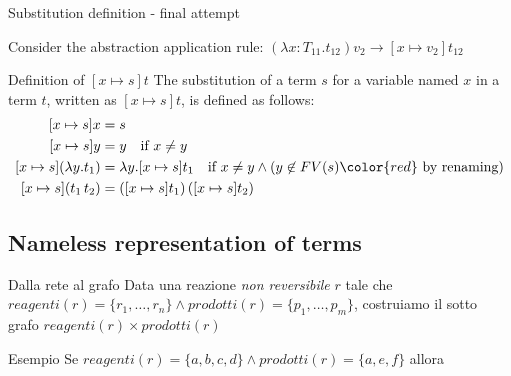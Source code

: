 \documentclass[8pt]{beamer}
\begin{document}
\begin{frame}{Substitution definition - final attempt}

    Consider the abstraction application rule:
        $(\lambda x:T_{11}.t_{12})v_{2} \rightarrow [x \mapsto v_{2}]t_{12}$

    \begin{block}{Definition of $[x \mapsto s]t$}
        The substitution of a term $s$ for a variable named $x$ in a term $t$,
        written as $[x \mapsto s]t$, is defined as follows:
        \begin{displaymath}
            \begin{split}
                [x \mapsto s]x &= s \\
                [x \mapsto s]y &= y \quad \text{if } x \not = y\\
                [x \mapsto s](\lambda y.t_{1}) &= \lambda y. [x \mapsto s]t_{1} 
                                    \quad \text{if } x \not = y 
                                    \wedge (y \not \in FV(s) 
                                    {\color{red} \text{ by renaming}})\\
                [x \mapsto s](t_{1} \, t_{2}) &= 
                    ([x \mapsto s]t_{1})\, ([x \mapsto s]t_{2})\\
            \end{split}
        \end{displaymath}        
    \end{block}
\end{frame}

\subsection{Nameless representation of terms}

\begin{frame}{Dalla rete al grafo}
  Data una reazione \emph{non reversibile} $r$ tale che $reagenti(r) =
  \{ r_{1}, \ldots, r_{n} \} \wedge prodotti(r) = \{ p_{1}, \ldots,
  p_{m} \}$, costruiamo il sotto grafo $reagenti(r) \times
  prodotti(r)$
    \begin{block}{Esempio}
      Se $reagenti(r) = \{ a, b, c, d \} \wedge prodotti(r) = \{a, e,
      f\}$ allora
    \end{block}
\end{frame}
\end{document}
